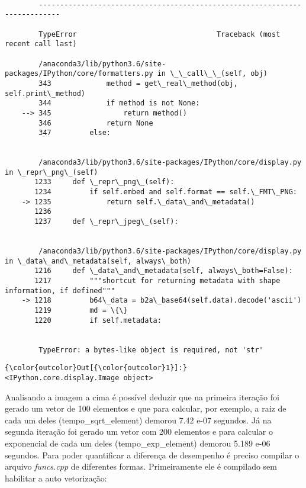 \documentclass[11pt]{article}
\begin{document}
    \begin{Verbatim}[commandchars=\\\{\}]

        ---------------------------------------------------------------------------

        TypeError                                 Traceback (most recent call last)

        /anaconda3/lib/python3.6/site-packages/IPython/core/formatters.py in \_\_call\_\_(self, obj)
        343             method = get\_real\_method(obj, self.print\_method)
        344             if method is not None:
    --> 345                 return method()
        346             return None
        347         else:


        /anaconda3/lib/python3.6/site-packages/IPython/core/display.py in \_repr\_png\_(self)
       1233     def \_repr\_png\_(self):
       1234         if self.embed and self.format == self.\_FMT\_PNG:
    -> 1235             return self.\_data\_and\_metadata()
       1236 
       1237     def \_repr\_jpeg\_(self):


        /anaconda3/lib/python3.6/site-packages/IPython/core/display.py in \_data\_and\_metadata(self, always\_both)
       1216     def \_data\_and\_metadata(self, always\_both=False):
       1217         """shortcut for returning metadata with shape information, if defined"""
    -> 1218         b64\_data = b2a\_base64(self.data).decode('ascii')
       1219         md = \{\}
       1220         if self.metadata:


        TypeError: a bytes-like object is required, not 'str'

    \end{Verbatim}

\begin{Verbatim}[commandchars=\\\{\}]
{\color{outcolor}Out[{\color{outcolor}1}]:} <IPython.core.display.Image object>
\end{Verbatim}
            
    Analisando a imagem a cima é possível deduzir que na primeira iteração
foi gerado um vetor de 100 elementos e que para calcular, por exemplo, a
raiz de cada um deles (tempo\_sqrt\_element) demorou 7.42 e-07 segundos.
Já na segunda iteração foi gerado um vetor com 200 elementos e para
calcular o exponencial de cada um deles (tempo\_exp\_element) demorou
5.189 e-06 segundos. Para poder quantificar a diferença de desempenho é
preciso compilar o arquivo \emph{funcs.cpp} de diferentes formas.
Primeiramente ele é compilado sem habilitar a auto vetorização:
\end{document}
